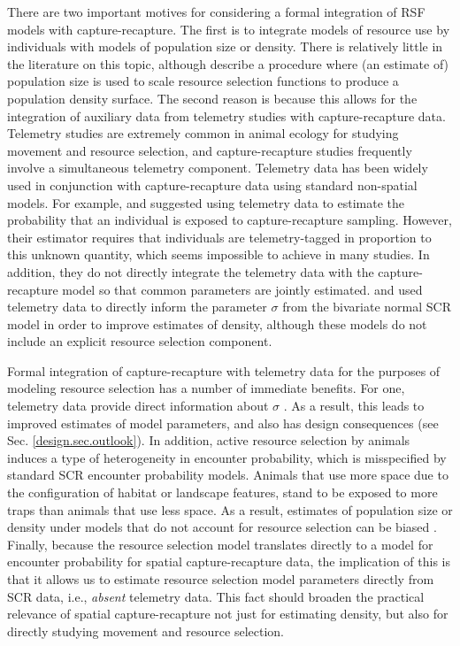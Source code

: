 There are two important motives for considering a formal integration
of RSF models with capture-recapture. The first is to integrate models
of resource use by individuals with models of population size or
density. There is relatively little in the literature on this topic,
although \citet{boyce_mcdonald:1999} describe a procedure where (an
estimate of) population size is used to scale resource selection
functions to produce a population density surface. The second reason is because
this allows for the integration of auxiliary data from telemetry
studies with capture-recapture data.  Telemetry studies are extremely
common in animal ecology for studying movement and resource selection,
and capture-recapture studies frequently involve a simultaneous
telemetry component.  Telemetry data has been widely used in
conjunction with capture-recapture data using standard non-spatial
models.  For example, \citet{white_shenk:2001} and \citet{ivan:2012}
suggested using telemetry data to estimate the probability that an
individual is exposed to capture-recapture sampling. However, their estimator requires
that individuals are telemetry-tagged in proportion to this unknown quantity,
which seems impossible to achieve in many studies. In addition, they
do not directly integrate the telemetry data with the
capture-recapture model so that common parameters are jointly
estimated.  \citet{sollmann_etal:inprepjapplecol} and
\citet{sollmann_etal:2012ecol} used telemetry data to directly inform
the parameter $\sigma$ from the bivariate normal SCR model in order to
improve estimates of density, although these models do not include an
explicit resource selection component.

Formal integration of capture-recapture with telemetry data for the
purposes of modeling resource selection has a number of immediate
benefits. For one, telemetry data provide direct information about
$\sigma$
\citep{sollmann_etal:2012ecol,sollmann_etal:inprepjapplecol}. As a
result, this leads to improved estimates of model parameters, and also
has design consequences (see Sec. \ref{design.sec.outlook}).  In
addition, active resource selection by animals induces a type of
heterogeneity in encounter probability, which is misspecified by
standard SCR encounter probability models.  Animals that use more
space due to the configuration of habitat or landscape features, stand
to be exposed to more traps than animals that use less space.
As a result, estimates of
population size or density under models that do not account for
resource selection can be biased \citep{royle_etal:2012mee}.  Finally,
because the resource selection model translates directly to a model
for encounter probability for spatial capture-recapture data, the
implication of this is that it allows us to estimate resource
selection model parameters directly from SCR data, i.e., {\it absent}
telemetry data. This fact should broaden the practical relevance of
spatial capture-recapture not just for estimating density, but also
for directly studying movement and resource selection.




